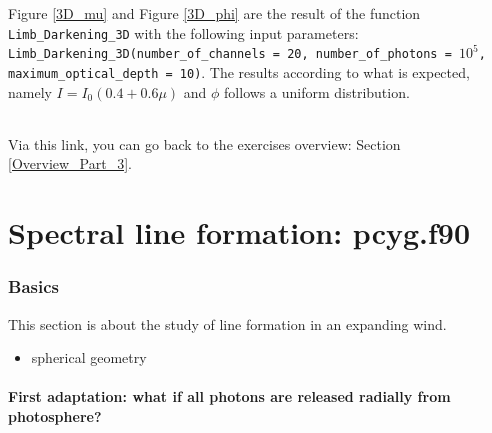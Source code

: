 \documentclass[../main/main.tex]{subfiles}
\begin{document}
Figure \ref{3D_mu} and Figure \ref{3D_phi}  are the result of 
the function \texttt{Limb\_Darkening\_3D} with the following input parameters: \texttt{Limb\_Darkening\_3D(number\_of\_channels = 20, number\_of\_photons = $10^5$, \\ maximum\_optical\_depth = 10)}. The results according to what is expected, namely $I = I_0(0.4+0.6\mu)$ and $\phi$ follows a uniform distribution.

\paragraph{}
\noindent{}

\vspace{0.4cm}
Via this link, you can go back to the exercises overview: Section \underline{\ref{Overview_Part_3}}.


\newpage
\part{Spectral line formation: pcyg.f90}

\section{Basics}
This section is about the study of line formation in an expanding wind.

\begin{center}
\end{center}

\begin{itemize}
\item spherical geometry
\end{itemize}


\subsection{First adaptation: what if all photons are released radially from photosphere?}
\label{PCYG FIRST adaptation}
\end{document}
